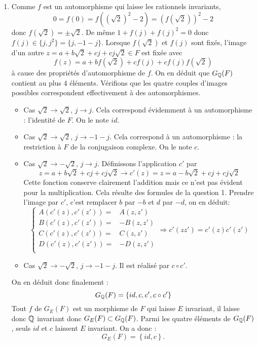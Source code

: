 \begin{enumerate}
\item  Comme $f$ est un automorphisme qui laisse les rationnels invariants,
\[
0=f(0)=f((\sqrt{2})^{2}-2)=\left( f(\sqrt{2})\right) ^{2}-2
\]
donc $f(\sqrt{2})=\pm \sqrt{2}$. De m\^{e}me $1+f(j)+f(j)^{2}=0$ donc $f(j)\in \{j,j^{2}\}=\{j,-1-j\}$.\newline
Lorsque $f(\sqrt{2})$ et $f(j)$ sont fix\'{e}s, l'image d'un autre $z=a+b\sqrt{2}+cj+cj\sqrt{2} \in F$ est fix\'{e}e avec 
\begin{displaymath}
f(z)=a+bf(\sqrt{2})+cf(j)+cf(j)f(\sqrt{2}) 
\end{displaymath}
\`{a} cause des propri\'{e}t\'{e}s d'automorphisme de $f$. On en d\'{e}duit que $G_{\mathbb{Q}}(F)$ contient au plus 4 \'{e}l\'{e}ments.\newline
Vérifions que les quatre couples d'images possibles correspondent effectivement à des automorphismes.
\begin{itemize}
 \item Cas $\sqrt{2}\rightarrow \sqrt{2}$, $j\rightarrow j$. Cela correspond évidemment à un automorphisme : l'identité de $F$. On le note $id$.
\item Cas $\sqrt{2}\rightarrow \sqrt{2}$, $j\rightarrow -1-j$. Cela correspond à un automorphisme : la restriction à $F$ de la conjugaison complexe. On le note $c$.
\item Cas $\sqrt{2}\rightarrow -\sqrt{2}$, $j\rightarrow j$. Définissons l'application $c'$ par
\begin{displaymath}
 z=a+b\sqrt{2}+cj+cj\sqrt{2} \rightarrow c'(z)=z=a-b\sqrt{2}+cj+cj\sqrt{2}
\end{displaymath}
Cette fonction conserve clairement l'addition mais ce n'est pas évident pour la multiplication. Cela résulte des formules de la question 1. Prendre l'image par $c'$, c'est remplacer $b$ par $-b$ et $d$ par $-d$, on en déduit:
\begin{displaymath}
 \left\lbrace 
\begin{aligned}
 A(c'(z),c'(z')) =& A(z,z')\\
 B(c'(z),c'(z')) =& -B(z,z')\\
 C(c'(z),c'(z')) =& C(z,z')\\
 D(c'(z),c'(z')) =& -D(z,z')\\
\end{aligned}
\right. 
\Rightarrow c'(zz') = c'(z)c'(z')
\end{displaymath}
\item Cas $\sqrt{2}\rightarrow -\sqrt{2}$, $j\rightarrow -1-j$. Il est réalisé par $c\circ c'$.
\end{itemize}
On en déduit donc finalement :
\begin{displaymath}
 G_{\mathbb{Q}}(F)=\{id,c,c',c\circ c'\}
\end{displaymath}
Tout $f$ de $G_E(F)$ est un morphisme de $F$ qui laisse $E$ invariant, il laisse donc $\mathbb{Q}$ invariant donc $G_E(F)\subset G_{\mathbb{Q}}(F)$. Parmi les quatre éléments de $G_{\mathbb{Q}}(F)$, seuls $id$ et $c$ laissent $E$ invariant. On a donc :
\begin{displaymath}
 G_E(F)=\left\lbrace id,c \right\rbrace .
\end{displaymath}

\end{enumerate}

